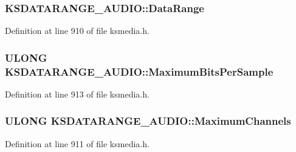 \subsubsection[{\texorpdfstring{Data\+Range}{DataRange}}]{ K\+S\+D\+A\+T\+A\+R\+A\+N\+G\+E\+\_\+\+A\+U\+D\+I\+O\+::\+Data\+Range}\hypertarget{struct_k_s_d_a_t_a_r_a_n_g_e___a_u_d_i_o_ac813d951cb63f7de6b5e0cc7c18c136d}{}\label{struct_k_s_d_a_t_a_r_a_n_g_e___a_u_d_i_o_ac813d951cb63f7de6b5e0cc7c18c136d}


Definition at line 910 of file ksmedia.\+h.

\subsubsection[{\texorpdfstring{Maximum\+Bits\+Per\+Sample}{MaximumBitsPerSample}}]{\setlength{\rightskip}{0pt plus 5cm}U\+L\+O\+NG K\+S\+D\+A\+T\+A\+R\+A\+N\+G\+E\+\_\+\+A\+U\+D\+I\+O\+::\+Maximum\+Bits\+Per\+Sample}\hypertarget{struct_k_s_d_a_t_a_r_a_n_g_e___a_u_d_i_o_ab16363498207d22501834543f35c3afd}{}\label{struct_k_s_d_a_t_a_r_a_n_g_e___a_u_d_i_o_ab16363498207d22501834543f35c3afd}


Definition at line 913 of file ksmedia.\+h.

\subsubsection[{\texorpdfstring{Maximum\+Channels}{MaximumChannels}}]{\setlength{\rightskip}{0pt plus 5cm}U\+L\+O\+NG K\+S\+D\+A\+T\+A\+R\+A\+N\+G\+E\+\_\+\+A\+U\+D\+I\+O\+::\+Maximum\+Channels}\hypertarget{struct_k_s_d_a_t_a_r_a_n_g_e___a_u_d_i_o_a0833265b8f9cc420f2321b9bbe8aa6ae}{}\label{struct_k_s_d_a_t_a_r_a_n_g_e___a_u_d_i_o_a0833265b8f9cc420f2321b9bbe8aa6ae}


Definition at line 911 of file ksmedia.\+h.

